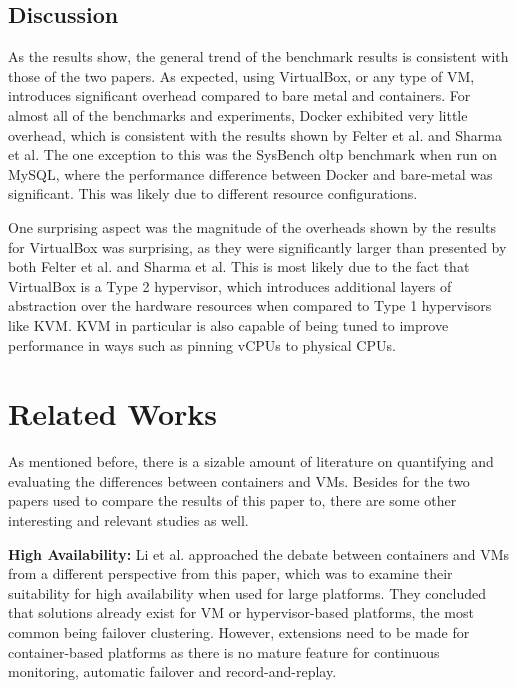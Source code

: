 \documentclass{sig-alternate-10pt}
\begin{document}
\subsection{Discussion}
As the results show, the general trend of the benchmark results is consistent with those of the two papers. As expected, using VirtualBox, or any type of VM, introduces significant overhead compared to bare metal and containers. For almost all of the benchmarks and experiments, Docker exhibited very little overhead, which is consistent with the results shown by Felter et al. and Sharma et al. The one exception to this was the SysBench oltp benchmark when run on MySQL, where the performance difference between Docker and bare-metal was significant. This was likely due to different resource configurations. 

One surprising aspect was the magnitude of the overheads shown by the results for VirtualBox was surprising, as they were significantly larger than presented by both Felter et al. and Sharma et al. This is most likely due to the fact that VirtualBox is a Type 2 hypervisor, which introduces additional layers of abstraction over the hardware resources when compared to Type 1 hypervisors like KVM. KVM in particular is also capable of being tuned to improve performance in ways such as pinning vCPUs to physical CPUs. 


\section{Related Works}
As mentioned before, there is a sizable amount of literature on quantifying and evaluating the differences between containers and VMs. Besides for the two papers used to compare the results of this paper to, there are some other interesting and relevant studies as well. 

\textbf{High Availability:} Li et al.\cite{li:2015} approached the debate between containers and VMs from a different perspective from this paper, which was to examine their suitability for high availability when used for large platforms. They concluded that solutions already exist for VM or hypervisor-based platforms, the most common being failover clustering. However, extensions need to be made for container-based platforms as there is no mature feature for continuous monitoring, automatic failover and record-and-replay\cite{li:2015}.
\end{document}
